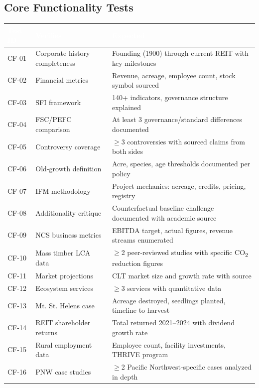 \documentclass[11pt,letterpaper]{article}
\newcommand{\tableheader}[1]{\textbf{\sffamily\textcolor{white}{#1}}}
\begin{document}
\subsection{Core Functionality Tests}

\begin{center}
\begin{tabularx}{\textwidth}{C{1.5cm}L{4cm}X}
\toprule
{}
\tableheader{Test ID} & \tableheader{Verifies} & \tableheader{Expected} \\
\midrule
CF-01 & Corporate history completeness & Founding (1900) through current REIT with key milestones \\
CF-02 & Financial metrics & Revenue, acreage, employee count, stock symbol sourced \\
CF-03 & SFI framework & 140+ indicators, governance structure explained \\
CF-04 & FSC/PEFC comparison & At least 3 governance/standard differences documented \\
CF-05 & Controversy coverage & $\geq$3 controversies with sourced claims from both sides \\
CF-06 & Old-growth definition & Acre, species, age thresholds documented per policy \\
CF-07 & IFM methodology & Project mechanics: acreage, credits, pricing, registry \\
CF-08 & Additionality critique & Counterfactual baseline challenge documented with academic source \\
CF-09 & NCS business metrics & EBITDA target, actual figures, revenue streams enumerated \\
CF-10 & Mass timber LCA data & $\geq$2 peer-reviewed studies with specific CO\textsubscript{2} reduction figures \\
CF-11 & Market projections & CLT market size and growth rate with source \\
CF-12 & Ecosystem services & $\geq$3 services with quantitative data \\
CF-13 & Mt. St. Helens case & Acreage destroyed, seedlings planted, timeline to harvest \\
CF-14 & REIT shareholder returns & Total returned 2021--2024 with dividend growth rate \\
CF-15 & Rural employment data & Employee count, facility investments, THRIVE program \\
CF-16 & PNW case studies & $\geq$2 Pacific Northwest-specific cases analyzed in depth \\
\bottomrule
\end{tabularx}
\end{center}
\end{document}
